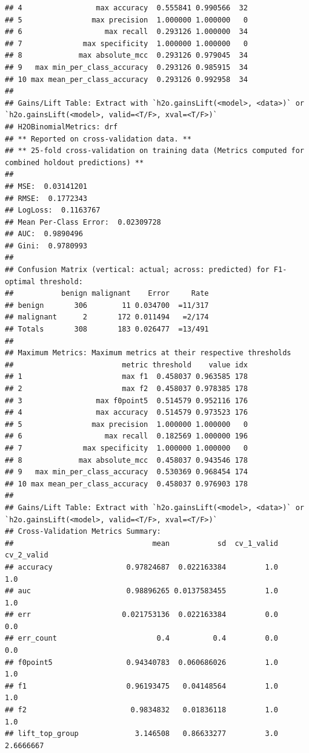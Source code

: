 \documentclass[]{article}
\begin{document}
\begin{verbatim}
## 4                 max accuracy  0.555841 0.990566  32
## 5                max precision  1.000000 1.000000   0
## 6                   max recall  0.293126 1.000000  34
## 7              max specificity  1.000000 1.000000   0
## 8             max absolute_mcc  0.293126 0.979045  34
## 9   max min_per_class_accuracy  0.293126 0.985915  34
## 10 max mean_per_class_accuracy  0.293126 0.992958  34
## 
## Gains/Lift Table: Extract with `h2o.gainsLift(<model>, <data>)` or `h2o.gainsLift(<model>, valid=<T/F>, xval=<T/F>)`
## H2OBinomialMetrics: drf
## ** Reported on cross-validation data. **
## ** 25-fold cross-validation on training data (Metrics computed for combined holdout predictions) **
## 
## MSE:  0.03141201
## RMSE:  0.1772343
## LogLoss:  0.1163767
## Mean Per-Class Error:  0.02309728
## AUC:  0.9890496
## Gini:  0.9780993
## 
## Confusion Matrix (vertical: actual; across: predicted) for F1-optimal threshold:
##           benign malignant    Error     Rate
## benign       306        11 0.034700  =11/317
## malignant      2       172 0.011494   =2/174
## Totals       308       183 0.026477  =13/491
## 
## Maximum Metrics: Maximum metrics at their respective thresholds
##                         metric threshold    value idx
## 1                       max f1  0.458037 0.963585 178
## 2                       max f2  0.458037 0.978385 178
## 3                 max f0point5  0.514579 0.952116 176
## 4                 max accuracy  0.514579 0.973523 176
## 5                max precision  1.000000 1.000000   0
## 6                   max recall  0.182569 1.000000 196
## 7              max specificity  1.000000 1.000000   0
## 8             max absolute_mcc  0.458037 0.943546 178
## 9   max min_per_class_accuracy  0.530369 0.968454 174
## 10 max mean_per_class_accuracy  0.458037 0.976903 178
## 
## Gains/Lift Table: Extract with `h2o.gainsLift(<model>, <data>)` or `h2o.gainsLift(<model>, valid=<T/F>, xval=<T/F>)`
## Cross-Validation Metrics Summary: 
##                                mean           sd  cv_1_valid  cv_2_valid
## accuracy                 0.97824687  0.022163384         1.0         1.0
## auc                      0.98896265 0.0137583455         1.0         1.0
## err                     0.021753136  0.022163384         0.0         0.0
## err_count                       0.4          0.4         0.0         0.0
## f0point5                 0.94340783  0.060686026         1.0         1.0
## f1                       0.96193475   0.04148564         1.0         1.0
## f2                        0.9834832   0.01836118         1.0         1.0
## lift_top_group             3.146508   0.86633277         3.0   2.6666667

\end{verbatim}
\end{document}
